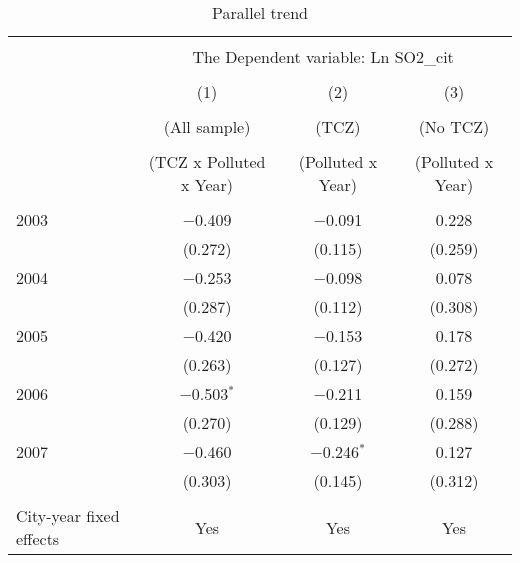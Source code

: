 \documentclass[12pt]{article}
\begin{document}
\begin{table}[!htbp] \centering
  \caption{Parallel trend}
  \begin{adjustbox}{width=\textwidth, totalheight=\baselineskip,keepaspectratio}
    \label{}
    \begin{tabular}{@{\extracolsep{5pt}}lccc}
      \\[-1.8ex]\hline
      \hline \\[-1.8ex]
      & \multicolumn{3}{c}{The Dependent variable: Ln SO2_{cit}} \\
      \cline{2-4}
      \\[-1.8ex] & (1) & (2) & (3)\\
      \\[-1.8ex] & (All sample) & (TCZ) & (No TCZ)\\
      \\[-1.8ex] & (TCZ x Polluted x Year) & (Polluted x Year) & (Polluted x Year)\\
      \hline \\[-1.8ex]
      2003                        & $-$0.409       & $-$0.091       & 0.228   \\
                                  & (0.272)        & (0.115)        & (0.259) \\
      2004                        & $-$0.253       & $-$0.098       & 0.078   \\
                                  & (0.287)        & (0.112)        & (0.308) \\
      2005                        & $-$0.420       & $-$0.153       & 0.178   \\
                                  & (0.263)        & (0.127)        & (0.272) \\
      2006                        & $-$0.503$^{*}$ & $-$0.211       & 0.159   \\
                                  & (0.270)        & (0.129)        & (0.288) \\
      2007                        & $-$0.460       & $-$0.246$^{*}$ & 0.127   \\
                                  & (0.303)        & (0.145)        & (0.312) \\
      \hline \\[-1.8ex]
      City-year fixed effects     & Yes            & Yes            & Yes     \\

\end{tabular}
\end{adjustbox}
\end{table}
\end{document}
